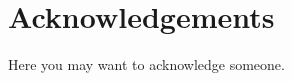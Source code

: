 \documentclass{Configuration_Files/PoliMi3i_thesis}
\begin{document}
\printglossary[type=\acronymtype]

\listoffigures

\listoftables


\chapter*{Acknowledgements}
Here you may want to acknowledge someone.

\cleardoublepage
\end{document}
